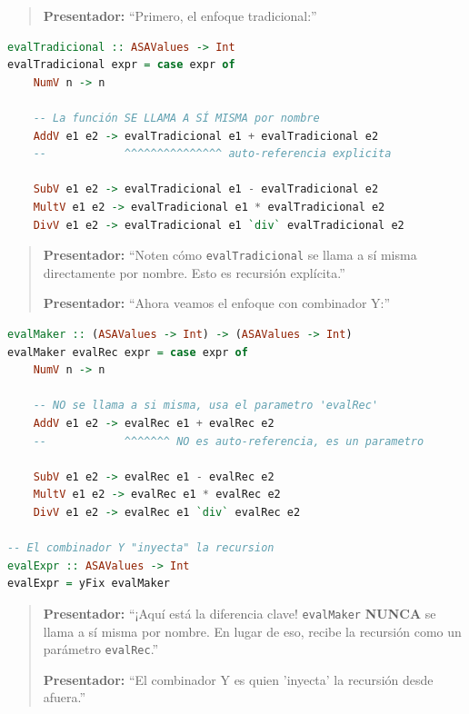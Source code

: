 \documentclass[12pt]{article}
\begin{document}
\begin{quote}
\textbf{Presentador:} ``Primero, el enfoque tradicional:''
\end{quote}

\begin{lstlisting}[language=Haskell, caption=Recursión Tradicional]
evalTradicional :: ASAValues -> Int
evalTradicional expr = case expr of
    NumV n -> n

    -- La función SE LLAMA A SÍ MISMA por nombre
    AddV e1 e2 -> evalTradicional e1 + evalTradicional e2
    --            ^^^^^^^^^^^^^^^ auto-referencia explicita

    SubV e1 e2 -> evalTradicional e1 - evalTradicional e2
    MultV e1 e2 -> evalTradicional e1 * evalTradicional e2
    DivV e1 e2 -> evalTradicional e1 `div` evalTradicional e2
\end{lstlisting}

\begin{quote}
\textbf{Presentador:} ``Noten cómo \texttt{evalTradicional} se llama a sí misma directamente por nombre. Esto es recursión explícita.''

\textbf{Presentador:} ``Ahora veamos el enfoque con combinador Y:''
\end{quote}

\begin{lstlisting}[language=Haskell, caption=Con Combinador Y]
evalMaker :: (ASAValues -> Int) -> (ASAValues -> Int)
evalMaker evalRec expr = case expr of
    NumV n -> n

    -- NO se llama a si misma, usa el parametro 'evalRec'
    AddV e1 e2 -> evalRec e1 + evalRec e2
    --            ^^^^^^^ NO es auto-referencia, es un parametro

    SubV e1 e2 -> evalRec e1 - evalRec e2
    MultV e1 e2 -> evalRec e1 * evalRec e2
    DivV e1 e2 -> evalRec e1 `div` evalRec e2

-- El combinador Y "inyecta" la recursion
evalExpr :: ASAValues -> Int
evalExpr = yFix evalMaker
\end{lstlisting}

\begin{quote}
\textbf{Presentador:} ``¡Aquí está la diferencia clave! \texttt{evalMaker} \textbf{NUNCA} se llama a sí misma por nombre. En lugar de eso, recibe la recursión como un parámetro \texttt{evalRec}.''

\textbf{Presentador:} ``El combinador Y es quien 'inyecta' la recursión desde afuera.''
\end{quote}
\end{document}
